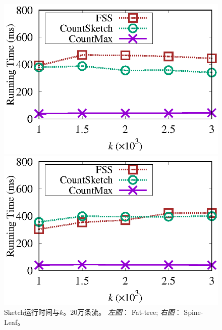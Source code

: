 \begin{figure}[!t]
	\centering
	\begin{minipage}[t]{0.49\linewidth}
		\centering
		\includegraphics[width=\linewidth]{fig/ft_k_time_200000.eps}
	\end{minipage}\vspace{-0.6em}%
	\begin{minipage}[t]{0.49\linewidth}
		\centering
		\includegraphics[width=\linewidth]{fig/hy_k_time_200000.eps}
	\end{minipage}\vspace{-0.6em}
	\caption{\textnormal{Sketch运行时间与$k$。20万条流。 \textit{左图}： Fat-tree; \textit{右图}： Spine-Leaf。}}
	\label{fig:time,k}
\end{figure}

